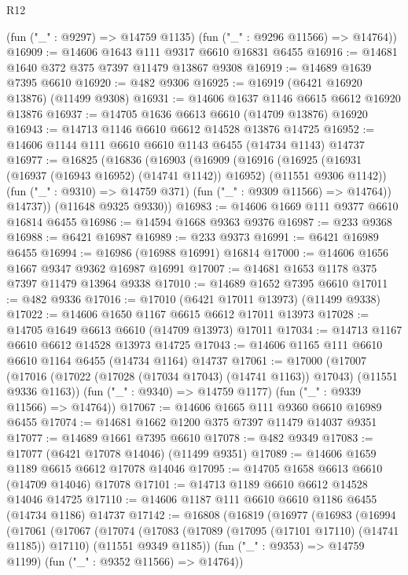 \begin{lexlean}{R12}
\begin{coremodule}
{{{{{{{{{{{{{{{{{{{{{{{{{{{{{{{{{{{{{{{{{{{{{{{{{{{{{{{{{{{{{{{{{{{{{{{{{{{{{{{{{{      (fun ("_" : @9297) => @14759 @1135)
      (fun ("_" : @9296 @11566) => @14764))
@16909 := @14606 @1643 @111 @9317 @6610 @16831 @6455
@16916 := @14681 @1640 @372 @375 @7397 @11479 @13867 @9308
@16919 := @14689 @1639 @7395 @6610
@16920 := @482 @9306
@16925 := @16919 (@6421 @16920 @13876) (@11499 @9308)
@16931 := @14606 @1637 @1146 @6615 @6612 @16920 @13876
@16937 := @14705 @1636 @6613 @6610 (@14709 @13876) @16920
@16943 := @14713 @1146 @6610 @6612 @14528 @13876 @14725
@16952 := @14606 @1144 @111 @6610 @6610 @1143 @6455 (@14734 @1143) @14737
@16977 := @16825
    (@16836
      (@16903
        (@16909
          (@16916
            (@16925 (@16931 (@16937 (@16943 @16952) (@14741 @1142)) @16952) (@11551 @9306 @1142))
            (fun ("_" : @9310) => @14759 @371)
            (fun ("_" : @9309 @11566) => @14764))
          @14737))
      (@11648 @9325 @9330))
@16983 := @14606 @1669 @111 @9377 @6610 @16814 @6455
@16986 := @14594 @1668 @9363 @9376
@16987 := @233 @9368
@16988 := @6421 @16987
@16989 := @233 @9373
@16991 := @6421 @16989 @6455
@16994 := @16986 (@16988 @16991) @16814
@17000 := @14606 @1656 @1667 @9347 @9362 @16987 @16991
@17007 := @14681 @1653 @1178 @375 @7397 @11479 @13964 @9338
@17010 := @14689 @1652 @7395 @6610
@17011 := @482 @9336
@17016 := @17010 (@6421 @17011 @13973) (@11499 @9338)
@17022 := @14606 @1650 @1167 @6615 @6612 @17011 @13973
@17028 := @14705 @1649 @6613 @6610 (@14709 @13973) @17011
@17034 := @14713 @1167 @6610 @6612 @14528 @13973 @14725
@17043 := @14606 @1165 @111 @6610 @6610 @1164 @6455 (@14734 @1164) @14737
@17061 := @17000
    (@17007
      (@17016 (@17022 (@17028 (@17034 @17043) (@14741 @1163)) @17043) (@11551 @9336 @1163))
      (fun ("_" : @9340) => @14759 @1177)
      (fun ("_" : @9339 @11566) => @14764))
@17067 := @14606 @1665 @111 @9360 @6610 @16989 @6455
@17074 := @14681 @1662 @1200 @375 @7397 @11479 @14037 @9351
@17077 := @14689 @1661 @7395 @6610
@17078 := @482 @9349
@17083 := @17077 (@6421 @17078 @14046) (@11499 @9351)
@17089 := @14606 @1659 @1189 @6615 @6612 @17078 @14046
@17095 := @14705 @1658 @6613 @6610 (@14709 @14046) @17078
@17101 := @14713 @1189 @6610 @6612 @14528 @14046 @14725
@17110 := @14606 @1187 @111 @6610 @6610 @1186 @6455 (@14734 @1186) @14737
@17142 := @16808
    (@16819
      (@16977
        (@16983
          (@16994
            (@17061
              (@17067
                (@17074
                  (@17083
                    (@17089 (@17095 (@17101 @17110) (@14741 @1185)) @17110)
                    (@11551 @9349 @1185))
                  (fun ("_" : @9353) => @14759 @1199)
                  (fun ("_" : @9352 @11566) => @14764))
}}}}}}}}}}}}}}}}}}}}}}}}}}}}}}}}}}}}}}}}}}}}}}}}}}}}}}}}}}}}}}}}}}}}}}}}}}}}}}}}}}
\end{coremodule}
\end{lexlean}
